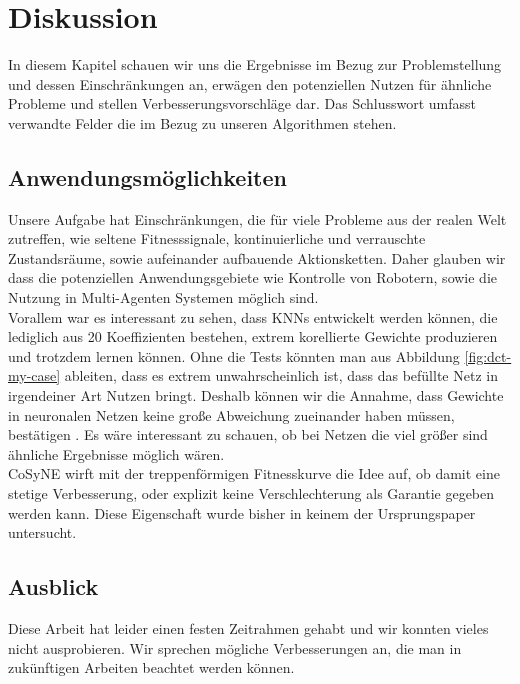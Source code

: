 \chapter{Diskussion}
    In diesem Kapitel schauen wir uns die Ergebnisse im Bezug zur Problemstellung und dessen Einschränkungen an, erwägen den potenziellen Nutzen für ähnliche Probleme und stellen Verbesserungsvorschläge dar. Das Schlusswort umfasst verwandte Felder die im Bezug zu unseren Algorithmen stehen.
    \section{Anwendungsmöglichkeiten}
        Unsere Aufgabe hat Einschränkungen, die für viele Probleme aus der realen Welt zutreffen, wie seltene Fitnesssignale, kontinuierliche und verrauschte Zustandsräume, sowie aufeinander aufbauende Aktionsketten. Daher glauben wir dass die potenziellen Anwendungsgebiete wie Kontrolle von Robotern, sowie die Nutzung in Multi-Agenten Systemen möglich sind.\\

        \noindent
        Vorallem war es interessant zu sehen, dass KNNs entwickelt werden können, die lediglich aus 20 Koeffizienten bestehen, extrem korellierte Gewichte produzieren und trotzdem lernen können. Ohne die Tests könnten man aus Abbildung \ref{fig:dct-my-case} ableiten, dass es extrem unwahrscheinlich ist, dass das befüllte Netz in irgendeiner Art Nutzen bringt. Deshalb können wir die Annahme, dass Gewichte in neuronalen Netzen keine große Abweichung zueinander haben müssen, bestätigen \cite{cosyne1}. Es wäre interessant zu schauen, ob bei Netzen die viel größer sind ähnliche Ergebnisse möglich wären. \\

        \noindent
        CoSyNE wirft mit der treppenförmigen Fitnesskurve die Idee auf, ob damit eine stetige Verbesserung, oder explizit keine Verschlechterung als Garantie gegeben werden kann. Diese Eigenschaft wurde bisher in keinem der Ursprungspaper untersucht.

\newpage

    \section{Ausblick}
        Diese Arbeit hat leider einen festen Zeitrahmen gehabt und wir konnten vieles nicht ausprobieren. Wir sprechen mögliche Verbesserungen an, die man in zukünftigen Arbeiten beachtet werden können.

